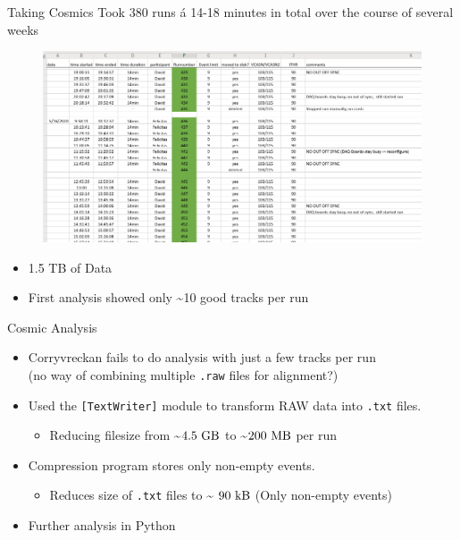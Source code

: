 \documentclass{beamer}
\begin{document}
\begin{frame}{Taking Cosmics} 
    Took 380 runs á 14-18 minutes in total over the course of several weeks
    \begin{figure}[H]
	\centering
	\includegraphics[width=.9\textwidth]{Screenshot.png}
    \end{figure}
    \footnotesize
    \begin{minipage}{.33\textwidth}
	\begin{itemize}
	    \item 1.5 TB of Data
	\end{itemize}
    \end{minipage}
    \begin{minipage}{.65\textwidth}
	\begin{itemize}
	    \item First analysis showed only \textasciitilde 10 good tracks
	       per run
	\end{itemize}
    \end{minipage}
\end{frame}

\begin{frame}[fragile]{Cosmic Analysis}
    \footnotesize
    \begin{itemize}
	\item Corryvreckan fails to do analysis with just a few tracks per run \\
	    \tiny (no way of combining multiple \verb`.raw` files for alignment?)
	    \footnotesize
	\item Used the \verb`[TextWriter]` module to transform RAW data into 
	    \verb`.txt` files.
	    \begin{itemize} 
		    \tiny \item Reducing filesize from \textasciitilde \( 4.5 \ \si{\giga \byte} \)
		    to \textasciitilde \( 200 \ \si{\mega \byte} \) per run \footnotesize
	    \end{itemize} 
	\pause
	\item Compression program stores only non-empty events.
	    \begin{itemize}
		    \tiny \item Reduces size of \verb`.txt` files to \textasciitilde
		    \( 90 \ \si{\kilo \byte} \) (Only non-empty events) \footnotesize
	    \end{itemize}
	\item Further analysis in Python
    \end{itemize}
\end{frame}
\end{document}

